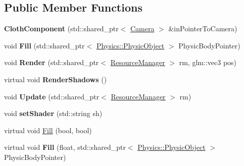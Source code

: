 \subsection*{Public Member Functions}
\begin{DoxyCompactItemize}
\item 
{\bfseries Cloth\+Component} (std\+::shared\+\_\+ptr$<$ \hyperlink{class_camera}{Camera} $>$ \&in\+Pointer\+To\+Camera)\hypertarget{class_component_1_1_cloth_component_a9f1c6b25320d8c8ebb0a6db5a263954f}{}\label{class_component_1_1_cloth_component_a9f1c6b25320d8c8ebb0a6db5a263954f}

\item 
void {\bfseries Fill} (std\+::shared\+\_\+ptr$<$ \hyperlink{class_physics_1_1_physic_object}{Physics\+::\+Physic\+Object} $>$ Physic\+Body\+Pointer)\hypertarget{class_component_1_1_cloth_component_acb3b11f2564e72d5a0fb9c9baf61151f}{}\label{class_component_1_1_cloth_component_acb3b11f2564e72d5a0fb9c9baf61151f}

\item 
void {\bfseries Render} (std\+::shared\+\_\+ptr$<$ \hyperlink{class_resource_manager}{Resource\+Manager} $>$ rm, glm\+::vec3 pos)\hypertarget{class_component_1_1_cloth_component_a0c7111ca675b583947eec0db6325b879}{}\label{class_component_1_1_cloth_component_a0c7111ca675b583947eec0db6325b879}

\item 
virtual void {\bfseries Render\+Shadows} ()\hypertarget{class_component_1_1_cloth_component_acfc9cbff108906ad03de7fbd71a69a9a}{}\label{class_component_1_1_cloth_component_acfc9cbff108906ad03de7fbd71a69a9a}

\item 
void {\bfseries Update} (std\+::shared\+\_\+ptr$<$ \hyperlink{class_resource_manager}{Resource\+Manager} $>$ rm)\hypertarget{class_component_1_1_cloth_component_a8a65ac909f98708aa75775ab3621cafa}{}\label{class_component_1_1_cloth_component_a8a65ac909f98708aa75775ab3621cafa}

\item 
void {\bfseries set\+Shader} (std\+::string sh)\hypertarget{class_component_1_1_cloth_component_a1dd222f5b5b2dc28ff7dd5ed6821dd09}{}\label{class_component_1_1_cloth_component_a1dd222f5b5b2dc28ff7dd5ed6821dd09}

\item 
virtual void \hyperlink{class_component_1_1_cloth_component_a576710f899b875a602bf4768590a805e}{Fill} (bool, bool)
\item 
virtual void {\bfseries Fill} (float, std\+::shared\+\_\+ptr$<$ \hyperlink{class_physics_1_1_physic_object}{Physics\+::\+Physic\+Object} $>$ Physic\+Body\+Pointer)\hypertarget{class_component_1_1_cloth_component_ae8977bbe31adb63fced8a18d8dd1109c}{}\label{class_component_1_1_cloth_component_ae8977bbe31adb63fced8a18d8dd1109c}


\end{DoxyCompactItemize}
